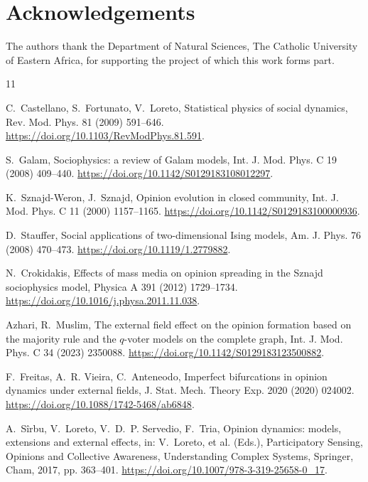 \documentclass[preprint,12pt]{elsarticle}
\begin{document}
\section*{Acknowledgements}

The authors thank the Department of Natural Sciences, The Catholic University of Eastern
Africa, for supporting the project of which this work forms part.

\begin{thebibliography}{11}

C.~Castellano, S.~Fortunato, V.~Loreto,
Statistical physics of social dynamics,
Rev. Mod. Phys. 81 (2009) 591--646. \href{https://doi.org/10.1103/RevModPhys.81.591}{https://doi.org/10.1103/RevModPhys.81.591}.

S.~Galam,
Sociophysics: a review of Galam models,
Int. J. Mod. Phys. C 19 (2008) 409--440. \href{https://doi.org/10.1142/S0129183108012297}{https://doi.org/10.1142/S0129183108012297}.

K.~Sznajd-Weron, J.~Sznajd,
Opinion evolution in closed community,
Int. J. Mod. Phys. C 11 (2000) 1157--1165. \href{https://doi.org/10.1142/S0129183100000936}{https://doi.org/10.1142/S0129183100000936}.

D.~Stauffer,
Social applications of two-dimensional Ising models,
Am. J. Phys. 76 (2008) 470--473. \href{https://doi.org/10.1119/1.2779882}{https://doi.org/10.1119/1.2779882}.

N.~Crokidakis,
Effects of mass media on opinion spreading in the Sznajd sociophysics model,
Physica A 391 (2012) 1729--1734. \href{https://doi.org/10.1016/j.physa.2011.11.038}{https://doi.org/10.1016/j.physa.2011.11.038}.

Azhari, R.~Muslim,
The external field effect on the opinion formation based on the majority rule and the
$q$-voter models on the complete graph,
Int. J. Mod. Phys. C 34 (2023) 2350088. \href{https://doi.org/10.1142/S0129183123500882}{https://doi.org/10.1142/S0129183123500882}.

F.~Freitas, A.~R. Vieira, C.~Anteneodo,
Imperfect bifurcations in opinion dynamics under external fields,
J. Stat. Mech. Theory Exp. 2020 (2020) 024002. \href{https://doi.org/10.1088/1742-5468/ab6848}{https://doi.org/10.1088/1742-5468/ab6848}.

A.~S\^{i}rbu, V.~Loreto, V.~D.~P. Servedio, F.~Tria,
Opinion dynamics: models, extensions and external effects,
in: V.~Loreto, et al. (Eds.), Participatory Sensing, Opinions and Collective Awareness,
Understanding Complex Systems, Springer, Cham, 2017, pp. 363--401.
\href{https://doi.org/10.1007/978-3-319-25658-0_17}{https://doi.org/10.1007/978-3-319-25658-0\_17}.


\end{thebibliography}
\end{document}
